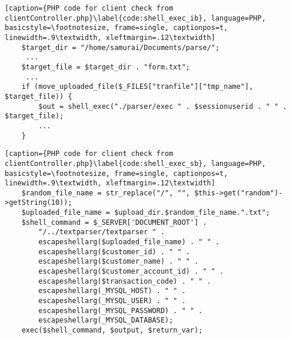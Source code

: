\begin{lstlisting}[caption={PHP code for client check from clientController.php}\label{code:shell_exec_ib}, language=PHP, basicstyle=\footnotesize, frame=single, captionpos=t, linewidth=.9\textwidth, xleftmargin=.12\textwidth]
    $target_dir = "/home/samurai/Documents/parse/";
     ...
    $target_file = $target_dir . "form.txt";
     ...
    if (move_uploaded_file($_FILES["tranfile"]["tmp_name"], $target_file)) {
        $out = shell_exec("./parser/exec " . $sessionuserid . " " . $target_file);
        ...
    }
\end{lstlisting}

\begin{lstlisting}[caption={PHP code for client check from clientController.php}\label{code:shell_exec_sb}, language=PHP, basicstyle=\footnotesize, frame=single, captionpos=t, linewidth=.9\textwidth, xleftmargin=.12\textwidth]
    $random_file_name = str_replace("/", "", $this->get("random")->getString(10));
    $uploaded_file_name = $upload_dir.$random_file_name.".txt";
    $shell_command = $_SERVER['DOCUMENT_ROOT'] .
        "/../textparser/textparser " .
        escapeshellarg($uploaded_file_name) . " " .
        escapeshellarg($customer_id) . " " .
        escapeshellarg($customer_name) . " " .
        escapeshellarg($customer_account_id) . " " .
        escapeshellarg($transaction_code) . " " .
        escapeshellarg(_MYSQL_HOST) . " " .
        escapeshellarg(_MYSQL_USER) . " " .
        escapeshellarg(_MYSQL_PASSWORD) . " " .
        escapeshellarg(_MYSQL_DATABASE);
    exec($shell_command, $output, $return_var);
\end{lstlisting}